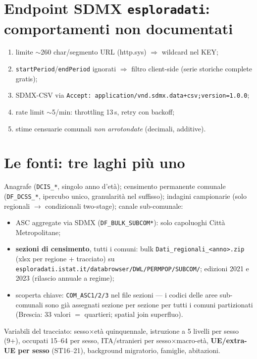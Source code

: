 \documentclass[11pt,a4paper]{article}
\newcommand{\code}[1]{\texttt{#1}}
\newcommand{\flow}[1]{\texttt{\small #1}}
\begin{document}
\section{Endpoint SDMX \code{esploradati}: comportamenti non documentati}
\label{sec:quirks}
\begin{enumerate}[leftmargin=*,itemsep=1pt]
  \item limite $\sim$260 char/segmento URL (http.sys) $\Rightarrow$ wildcard nel KEY;
  \item \code{startPeriod}/\code{endPeriod} ignorati $\Rightarrow$ filtro client-side
  (serie storiche complete gratis);
  \item SDMX-CSV via \code{Accept: application/vnd.sdmx.data+csv;version=1.0.0};
  \item rate limit $\sim$5/min: throttling 13\,s, retry con backoff;
  \item stime censuarie comunali \emph{non arrotondate} (decimali, additive).
\end{enumerate}

\section{Le fonti: tre laghi pi\`u uno}
\label{sec:laghi}
Anagrafe (\flow{DCIS\_*}, singolo anno d'et\`a); censimento permanente
comunale (\flow{DF\_DCSS\_*}, ipercubo unico, granularit\`a nel suffisso);
indagini campionarie (solo regionali $\to$ condizionali two-stage); canale
sub-comunale:
\begin{itemize}[leftmargin=*,itemsep=1pt]
  \item ASC aggregate via SDMX (\flow{DF\_BULK\_SUBCOM*}): solo capoluoghi
  Citt\`a Metropolitane;
  \item \textbf{sezioni di censimento}, tutti i comuni: bulk
  \code{Dati\_regionali\_<anno>.zip} (xlsx per regione + tracciato) su
  \code{esploradati.istat.it/databrowser/DWL/PERMPOP/SUBCOM/}; edizioni 2021
  e 2023 (rilascio annuale a regime);
  \item scoperta chiave: \code{COM\_ASC1/2/3} nel file sezioni --- i codici
  delle aree sub-comunali sono gi\`a assegnati sezione per sezione per tutti
  i comuni partizionati (Brescia: 33 valori $=$ quartieri; spatial join
  superfluo).
\end{itemize}
Variabili del tracciato: sesso$\times$et\`a quinquennale, istruzione a 5
livelli per sesso (9+), occupati 15--64 per sesso, ITA/stranieri per
sesso$\times$macro-et\`a, \textbf{UE/extra-UE per sesso} (ST16--21),
background migratorio, famiglie, abitazioni.
\end{document}
